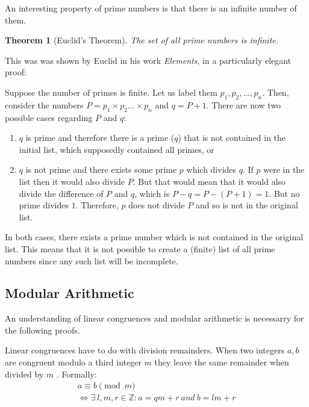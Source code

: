 \documentclass[12pt, titlepage]{article}
\newtheorem{theorem}{Theorem}
\begin{document}
    An interesting property of prime numbers is that there is an infinite number of them. 
    \begin{theorem}[Euclid's Theorem]
        The set of all prime numbers is infinite.
    \end{theorem}
%
    This was was shown by Euclid in his work \emph{Elements}, in a particularly elegant
    proof\autocite[19]{dence}:

    Suppose the number of primes is finite. Let us label them $p_1, p_2, ..., p_n$. Then,
    consider the numbers $P = p_1\times p_2 ... \times p_n$ and $q = P + 1$. There are now
    two possible cases regarding $P$ and $q$:
    \begin{enumerate}[label=\alph*)]
        \item $q$ is prime and therefore there is a prime ($q$) that is not contained in the
            initial list, which supposedly contained all primes, or
        \item $q$ is not prime and there exists some prime $p$ which divides $q$. If $p$
            were in the list then it would also divide $P$. But that would mean that it
            would also divide the difference of $P$ and $q$, which is $P - q = P - (P + 1) =
            1$. But no prime divides $1$.  Therefore, $p$ does not divide $P$ and so is not
            in the original list.
    \end{enumerate}
    In both cases, there exists a prime number which is not contained in the original list.
    This means that it is not possible to create a (finite) list of all prime numbers since
    any such list will be incomplete.
        

    \subsection{Modular Arithmetic}
    An understanding of linear congruences and modular arithmetic is necessarry for the
    following proofs.

    Linear congruences have to do with division remainders. When two integers $a, b$ are
    congruent modulo a third integer $m$ they leave the same remainder when divided by $m$
    \autocite[278]{haese_ib_options}. Formally:
    \begin{equation}\label{eq:congr_def_long}
        \begin{gathered}
            a \equiv b \pmod{m} \\
            \iff \exists\ l,m,r \in \mathbb{Z}: a = qm + r\ and\ b = lm + r
        \end{gathered}
    \end{equation}
\end{document}
